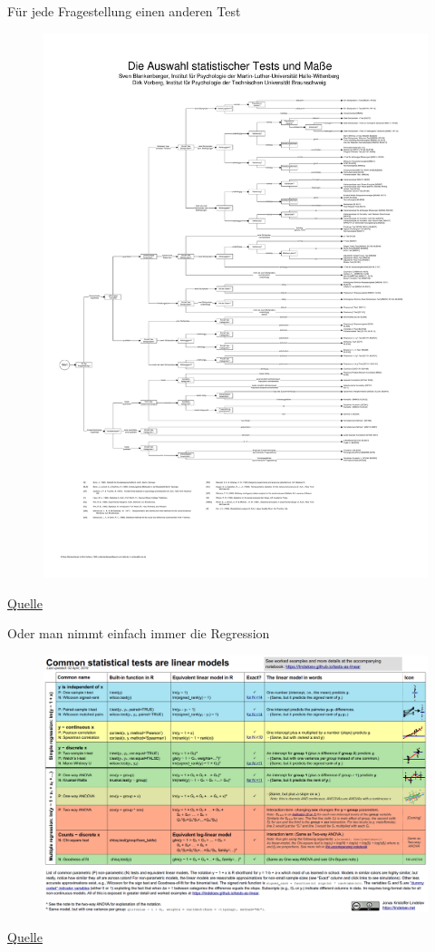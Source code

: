 \documentclass[
  ngerman,
  ignorenonframetext,
]{beamer}
\begin{document}
\begin{frame}{Für jede Fragestellung einen anderen Test}
\protect\hypertarget{fuxfcr-jede-fragestellung-einen-anderen-test}{}
\begin{figure}[H]

{\centering \includegraphics[width=0.7\linewidth]{img/entscheidungsbaum} 

}

\end{figure}

\href{https://md.psych.bio.uni-goettingen.de/mv/entscheidungsbaum.pdf}{Quelle}
\end{frame}

\begin{frame}{Oder man nimmt einfach immer die Regression}
\protect\hypertarget{oder-man-nimmt-einfach-immer-die-regression}{}
\begin{figure}[H]

{\centering \includegraphics[width=0.7\linewidth]{img/linear_tests_cheat_sheet} 

}

\end{figure}

\href{https://lindeloev.github.io/tests-as-linear/}{Quelle}
\end{frame}
\end{document}
